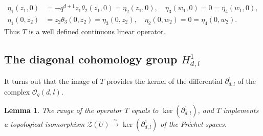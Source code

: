 \documentclass[12pt,reqno]{amsart}%
\theoremstyle{plain}
\newtheorem{lemma}{Lemma}
\numberwithin{theorem}{section} \numberwithin{equation}{section}
\numberwithin{lemma}{section}
\numberwithin{remark}{section}
\numberwithin{example}{section}
\numberwithin{proposition}{section}
\numberwithin{definition}{section}
\numberwithin{corollary}{section}
\begin{document}
\begin{align*}
\eta_{1}\left(  z_{1},0\right)   &  =-q^{d+1}z_{1}\theta_{2}\left(
z_{1},0\right)  =\eta_{2}\left(  z_{1},0\right)  ,\quad\eta_{3}\left(
w_{1},0\right)  =0=\eta_{4}\left(  w_{1},0\right)  ,\\
\eta_{1}\left(  0,z_{2}\right)   &  =z_{2}\theta_{3}\left(  0,z_{2}\right)
=\eta_{3}\left(  0,z_{2}\right)  ,\quad\eta_{2}\left(  0,w_{2}\right)
=0=\eta_{4}\left(  0,w_{2}\right)  .
\end{align*}
Thus $T$ is a well defined continuous linear operator.

\subsection{The diagonal cohomology group $H_{d,l}^{1}$\label{subsecDC}}

It turns out that the image of $T$ provides the kernel of the differential
$\partial_{d,l}^{1}$ of the complex $\mathcal{O}_{q}\left(  d,l\right)  $.

\begin{lemma}
\label{lemTech4}The range of the operator $T$ equals to $\ker\left(
\partial_{d,l}^{1}\right)  $, and $T$ implements a topological isomorphism
$\mathcal{Z}\left(  U\right)  \overset{\simeq}{\longrightarrow}\ker\left(
\partial_{d,l}^{1}\right)  $ of the Fr\'{e}chet spaces.
\end{lemma}
\end{document}
